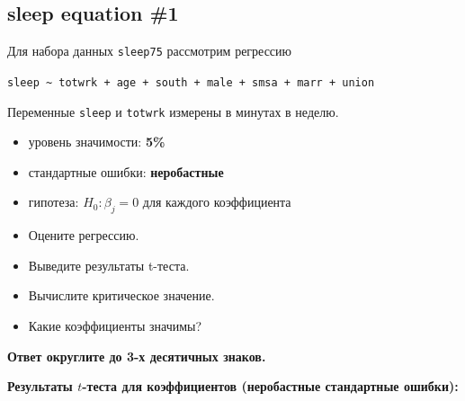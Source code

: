 \documentclass[
  russian,
]{article}
\providecommand{\tightlist}{%
  \setlength{\itemsep}{0pt}\setlength{\parskip}{0pt}}
\begin{document}
\subsection{sleep equation \#1}\label{sleep-equation-1}

Для набора данных \texttt{sleep75} рассмотрим регрессию

\texttt{sleep\ \textasciitilde{}\ totwrk\ +\ age\ +\ south\ +\ male\ +\ smsa\ +\ marr\ +\ union}

Переменные \texttt{sleep} и \texttt{totwrk} измерены в минутах в неделю.

\begin{tcolorbox}[enhanced jigsaw, arc=.35mm, bottomrule=.15mm, bottomtitle=1mm, breakable, colback=white, colbacktitle=quarto-callout-important-color!10!white, colframe=quarto-callout-important-color-frame, coltitle=black, left=2mm, leftrule=.75mm, opacityback=0, opacitybacktitle=0.6, rightrule=.15mm, title=\textcolor{quarto-callout-important-color}{\faExclamation}\hspace{0.5em}{Условия теста}, titlerule=0mm, toprule=.15mm, toptitle=1mm]

\begin{itemize}
\tightlist
\item
  уровень значимости: \textbf{5\%}
\item
  стандартные ошибки: \textbf{неробастные}
\item
  гипотеза: \(H_0:\beta_j=0\) для каждого коэффициента
\end{itemize}

\end{tcolorbox}

\begin{itemize}
\tightlist
\item
  Оцените регрессию.
\item
  Выведите результаты t-теста.
\item
  Вычислите критическое значение.
\item
  Какие коэффициенты значимы?
\end{itemize}

\textbf{Ответ округлите до 3-х десятичных знаков.}

\textbf{Результаты \(t\)-теста для коэффициентов (неробастные
стандартные ошибки):}
\end{document}
